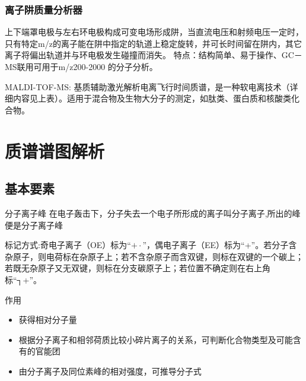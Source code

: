 \subsubsection*{离子阱质量分析器}
上下端罩电极与左右环电极构成可变电场形成阱，当直流电压和射频电压一定时，只有特定m/z的离子能在阱中指定的轨道上稳定旋转，并可长时间留在阱内，其它离子将偏出轨道并与环电极发生碰撞而消失。
特点：结构简单、易于操作、GC－MS联用可用于m/z200-2000 的分子分析。

\begin{definition*}{MALDI-TOF-MS:}
    基质辅助激光解析电离飞行时间质谱，是一种软电离技术（详细内容见上表）。适用于混合物及生物大分子的测定，如肽类、蛋白质和核酸类化合物。
\end{definition*}

\section{质谱谱图解析}
\subsection{基本要素}
\begin{definition*}{分子离子峰}
    在电子轰击下，分子失去一个电子所形成的离子叫分子离子,所出的峰便是分子离子峰
\end{definition*}
\begin{note}
    标记方式:奇电子离子（OE）标为“$+\cdot$”，偶电子离子（EE）标为“+”。若分子含杂原子，则电荷标在杂原子上；若不含杂原子而含双键，则标在双键的一个碳上；若既无杂原子又无双键，则标在分支碳原子上；若位置不确定则在右上角标“┐+”。
\end{note}

作用
\begin{itemize}
    \item 获得相对分子量
    \item 根据分子离子和相邻荷质比较小碎片离子的关系，可判断化合物类型及可能含有的官能团
    \item 由分子离子及同位素峰的相对强度，可推导分子式
\end{itemize}

